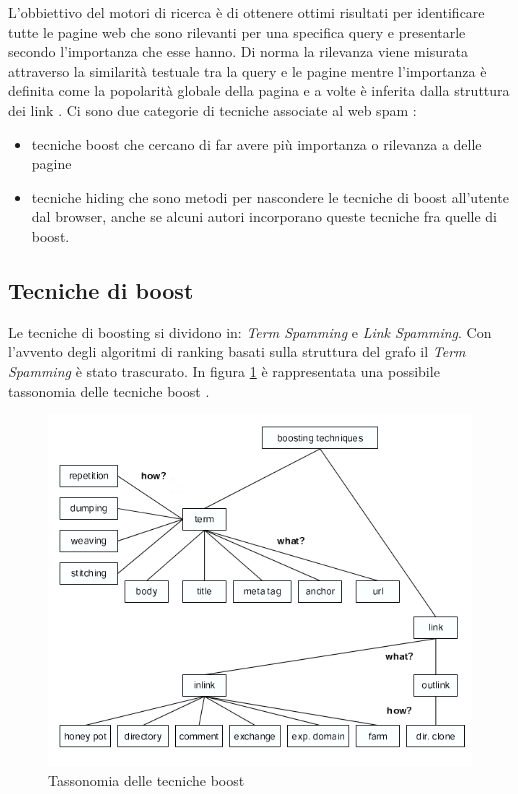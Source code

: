 L'obbiettivo del motori di ricerca è di ottenere ottimi risultati per identificare tutte le pagine web che sono rilevanti per una specifica query e presentarle secondo l'importanza che esse hanno. Di norma la rilevanza viene misurata attraverso la similarità testuale tra la query e le pagine mentre l'importanza è definita come la popolarità globale della pagina e a volte è inferita dalla struttura dei link \cite{ilprints646}. Ci sono due categorie di tecniche associate al web spam \cite{ilprints646}:
\begin{itemize}
\item tecniche boost che cercano di far avere più importanza o rilevanza a delle pagine
\item tecniche hiding che sono metodi per nascondere le tecniche di boost all'utente dal browser, anche se alcuni autori incorporano queste tecniche fra quelle di boost.
\end{itemize}

\subsection{Tecniche di boost}
Le tecniche di boosting si dividono in: \textit{Term Spamming} e \textit{Link Spamming}. Con l'avvento degli algoritmi di ranking basati sulla struttura del grafo il \textit{Term Spamming} è stato trascurato. In figura \ref{fig:tassonomiaTecnicheBoost} è rappresentata una possibile tassonomia delle tecniche boost \cite{ilprints646}.
\begin{figure} 
 \centering
 \includegraphics[width=12cm]{immagini/tassonomiaTecnicheBoost}
 \caption{Tassonomia delle tecniche boost}
 \label{fig:tassonomiaTecnicheBoost}
\end{figure}

